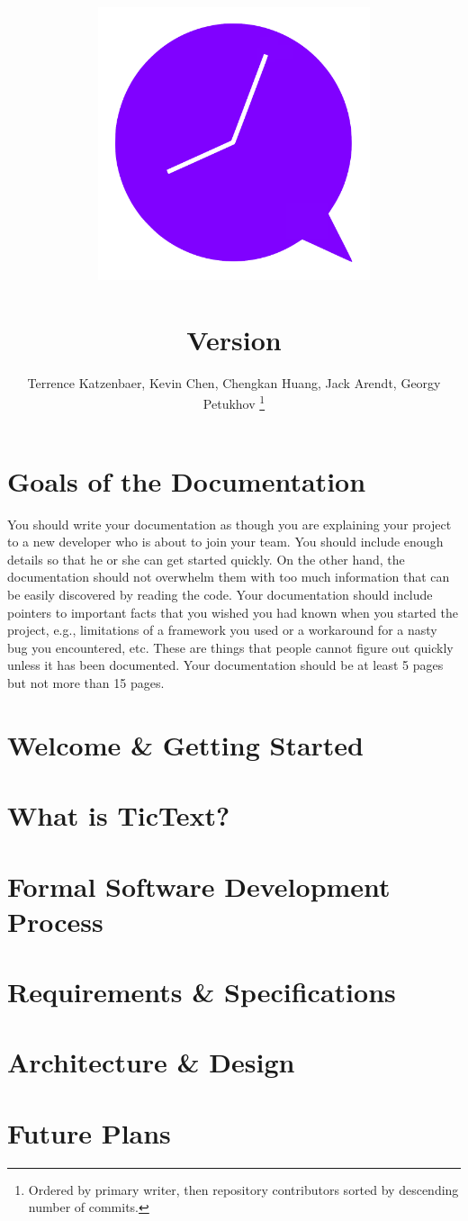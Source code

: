 \documentclass[11pt, titlepage]{article} %
\title{
\includegraphics[width=8cm]{icon}\\
\kDocTitle\\
\large{Version \kDocVersion}
}
\author{
	Terrence Katzenbaer, Kevin Chen, Chengkan Huang, Jack Arendt, Georgy Petukhov
	\footnote{Ordered by primary writer, then repository contributors sorted by descending number of commits.}
}
\begin{document}
\maketitle
\tableofcontents

\clearpage
\section{Goals of the Documentation}
You should write your documentation as though you are explaining your project to a new developer who is about to join your team. You should include enough details so that he or she can get started quickly. On the other hand, the documentation should not overwhelm them with too much information that can be easily discovered by reading the code.
Your documentation should include pointers to important facts that you wished you had known when you started the project, e.g., limitations of a framework you used or a workaround for a nasty bug you encountered, etc. These are things that people cannot figure out quickly unless it has been documented. Your documentation should be at least 5 pages but not more than 15 pages.

\clearpage
\section{Welcome \& Getting Started}


\clearpage
\section{What is TicText?}


\clearpage
\section{Formal Software Development Process}


\clearpage
\section{Requirements \& Specifications}


\clearpage
\section{Architecture \& Design}


\clearpage
\section{Future Plans}

\end{document}
